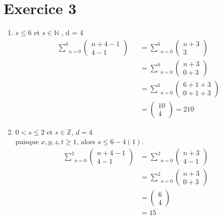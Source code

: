 \documentclass[fontsize=10pt]{article}
\begin{document}
\section*{Exercice 3}
\begin{enumerate}
\item $s \leq 6 $ et $s \in \mathbb{N}$ \hspace{0.5cm}, \hspace{0.5cm} d = 4
\begin{align*}
&\underset{n=0}{\overset{6}{\sum}}\begin{pmatrix}
n + 4 -1\\
4-1
\end{pmatrix} &&=
\underset{n=0}{\overset{6}{\sum}}\begin{pmatrix}
n + 3\\
3
\end{pmatrix}\\
&&&=
\underset{n=0}{\overset{6}{\sum}}\begin{pmatrix}
n + 3\\
0+3
\end{pmatrix}\\
&&&=\underset{n=0}{\overset{6}{\sum}}\begin{pmatrix}
6+1+3\\
0+1+3
\end{pmatrix}\\&&&= \begin{pmatrix} 10 \\ 4\end{pmatrix} = 210
\end{align*}
\item$ 0 < s \leq 2$ et $s \in \mathbb{Z}$, $d=4$\\
puisque $x,y,z,t \geq 1$, alors $s \leq 6 - 4(1)$.
\begin{align*}
\underset{n=0}{\overset{2}{\sum}}
\begin{pmatrix}
n+4-1\\
4-1
\end{pmatrix} &=\underset{n=0}{\overset{2}{\sum}}
\begin{pmatrix}
n+3\\
4-1
\end{pmatrix}\\
&=\underset{n=0}{\overset{2}{\sum}}
\begin{pmatrix}
n+3\\
0+3
\end{pmatrix}\\
&=
\begin{pmatrix}
6\\
4
\end{pmatrix}\\
&=15
\end{align*}


\end{enumerate}
\end{document}
